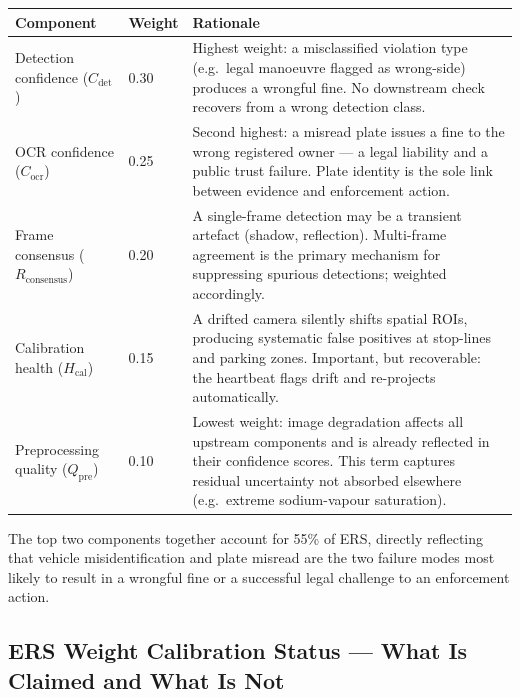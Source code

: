\documentclass[11pt,a4paper]{article}
\begin{document}
\begin{center}
\begin{tabular}{L{3.2cm} C{1.2cm} L{9.5cm}}
    \toprule
    \color{white}\textbf{Component} & \color{white}\textbf{Weight} & \color{white}\textbf{Rationale} \\
    \midrule
    Detection confidence ($C_{\text{det}}$) & 0.30 & Highest weight: a misclassified violation type (e.g.\ legal manoeuvre flagged as wrong-side) produces a wrongful fine. No downstream check recovers from a wrong detection class. \\
    OCR confidence ($C_{\text{ocr}}$) & 0.25 & Second highest: a misread plate issues a fine to the wrong registered owner — a legal liability and a public trust failure. Plate identity is the sole link between evidence and enforcement action. \\
    Frame consensus ($R_{\text{consensus}}$) & 0.20 & A single-frame detection may be a transient artefact (shadow, reflection). Multi-frame agreement is the primary mechanism for suppressing spurious detections; weighted accordingly. \\
    Calibration health ($H_{\text{cal}}$) & 0.15 & A drifted camera silently shifts spatial ROIs, producing systematic false positives at stop-lines and parking zones. Important, but recoverable: the heartbeat flags drift and re-projects automatically. \\
    Preprocessing quality ($Q_{\text{pre}}$) & 0.10 & Lowest weight: image degradation affects all upstream components and is already reflected in their confidence scores. This term captures residual uncertainty not absorbed elsewhere (e.g.\ extreme sodium-vapour saturation). \\
    \bottomrule
\end{tabular}
\end{center}

\noindent The top two components together account for 55\% of ERS, directly reflecting that vehicle misidentification and plate misread are the two failure modes most likely to result in a wrongful fine or a successful legal challenge to an enforcement action.

\subsection*{ERS Weight Calibration Status — What Is Claimed and What Is Not}
\end{document}
